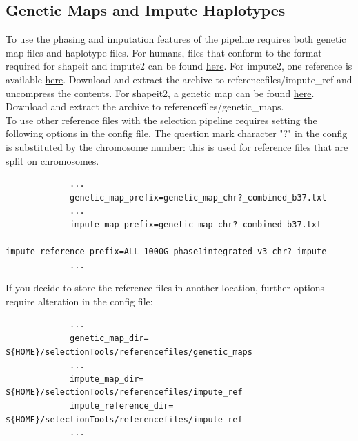 \documentclass[a4paper,10pt]{article}
\begin{document}
             \subsection{Genetic Maps and Impute Haplotypes}
             To use the phasing and imputation features of the pipeline requires
             both genetic map files and haplotype files. For humans, files
             that conform to the format required for shapeit and impute2 can be
             found
             \href{http://mathgen.stats.ox.ac.uk/impute/impute_v2.html#reference}{here}. For
             impute2, one reference is available
             \href{http://mathgen.stats.ox.ac.uk/impute/ALL_1000G_phase1integrated_v3_impute_macGT1.tgz}{here}.
             Download and extract the archive to referencefiles/impute\_ref and
             uncompress the contents. For shapeit2, a genetic map can be found
             \href{http://www.shapeit.fr/files/genetic_map_b37.tar.gz}{here}.
             Download and extract the archive to referencefiles/genetic\_maps. \\


             To use other reference files with the selection pipeline requires
             setting the following options in the config file. The question mark character
             "?" in the config is substituted by the chromosome number: this is
             used for reference files that are split on chromosomes.\\

             \begin{verbatim}
             ...
             genetic_map_prefix=genetic_map_chr?_combined_b37.txt
             ...
             impute_map_prefix=genetic_map_chr?_combined_b37.txt
             impute_reference_prefix=ALL_1000G_phase1integrated_v3_chr?_impute
             ...
             \end{verbatim}

             \noindent
             If you decide to store the reference files in another location,
             further options require alteration in the config file:\\ 
             \begin{verbatim}
             ...
             genetic_map_dir= ${HOME}/selectionTools/referencefiles/genetic_maps
             ...
             impute_map_dir= ${HOME}/selectionTools/referencefiles/impute_ref
             impute_reference_dir= ${HOME}/selectionTools/referencefiles/impute_ref
             ...
             \end{verbatim}
\end{document}

